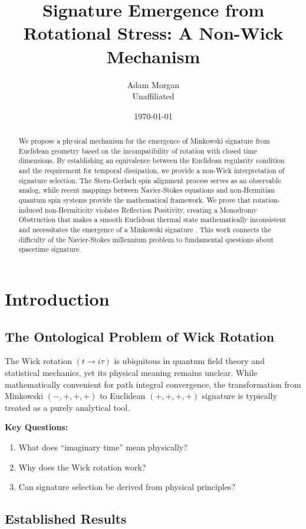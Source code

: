 \documentclass[11pt]{article}
\title{Signature Emergence from Rotational Stress: A Non-Wick Mechanism}
\author{Adam Morgan\\
\small Unaffiliated}
\date{\today}
\begin{document}
\maketitle

\begin{abstract}
We propose a physical mechanism for the emergence of Minkowski signature from Euclidean geometry based on the incompatibility of rotation with closed time dimensions. By establishing an equivalence between the Euclidean regularity condition and the requirement for temporal dissipation, we provide a non-Wick interpretation of signature selection. The Stern-Gerlach spin alignment process serves as an observable analog, while recent mappings between Navier-Stokes equations and non-Hermitian quantum spin systems provide the mathematical framework.  We prove that rotation-induced non-Hermiticity violates Reflection Positivity, creating a Monodromy Obstruction that makes a smooth Euclidean thermal state mathematically inconsistent and necessitates the emergence of a Minkowski signature . This work connects the difficulty of the Navier-Stokes millennium problem to fundamental questions about spacetime signature.
\end{abstract}

\section{Introduction}

\subsection{The Ontological Problem of Wick Rotation}

The Wick rotation $(t \to i\tau)$ is ubiquitous in quantum field theory and statistical mechanics, yet its physical meaning remains unclear. While mathematically convenient for path integral convergence, the transformation from Minkowski $(-,+,+,+)$ to Euclidean $(+,+,+,+)$ signature is typically treated as a purely analytical tool.

\textbf{Key Questions:}
\begin{enumerate}
\item What does ``imaginary time'' mean physically?
\item Why does the Wick rotation work?
\item Can signature selection be derived from physical principles?
\end{enumerate}

\subsection{Established Results}
\end{document}
